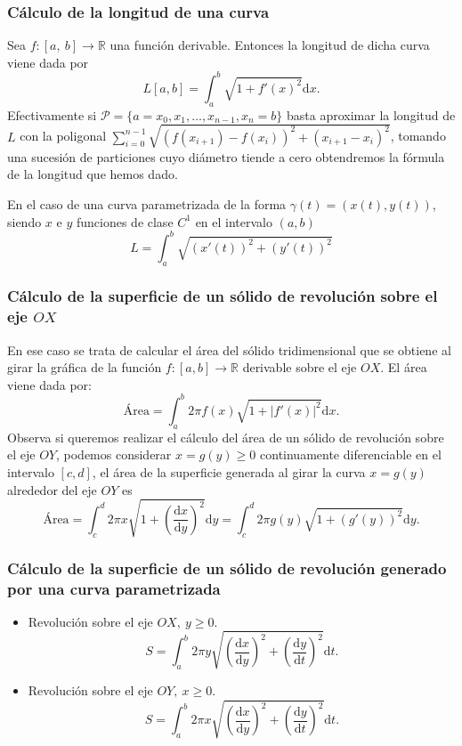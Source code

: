\subsubsection{Cálculo de la longitud de una curva}
Sea $f:[a,~b]\rightarrow\mathbb{R}$ una función derivable. Entonces la longitud de dicha curva viene dada por \[ L[a,b]=\int_a^b\sqrt{1+f'(x)^2}\mathrm{d}x. \] Efectivamente si $\mathcal{P}=\{a=x_0,x_1,\hdots,x_{n-1},x_n=b\}$ basta aproximar la longitud de $L$ con la poligonal $\sum_{i=0}^{n-1}\sqrt{\left(f(x_{i+1})-f(x_i)\right)^2+(x_{i+1}-x_i)^2}$, tomando una sucesión de particiones cuyo diámetro tiende a cero obtendremos la fórmula de la longitud que hemos dado.

En el caso de una curva parametrizada de la forma $\gamma(t)=\left(x(t),y(t)\right)$, siendo $x$ e $y$ funciones de clase $C^1$ en el intervalo $(a,b)$ \[ L=\int_a^b\sqrt{\left(x'(t)\right)^2+\left(y'(t)\right)^2} \]
\subsubsection{Cálculo de la superficie de un sólido de revolución sobre el eje $OX$}
En ese caso se trata de calcular el área del sólido tridimensional que se obtiene al girar la gráfica de la función $f:[a,b]\rightarrow\mathbb{R}$ derivable sobre el eje $OX$. El área viene dada por: \[ \text{Área}=\int_a^b2\pi f(x)\sqrt{1+|f'(x)|^2}\mathrm{d}x. \] Observa si queremos realizar el cálculo del área de un sólido de revolución sobre el eje $OY$, podemos considerar $x=g(y)\ge0$ continuamente diferenciable en el intervalo $[c,d]$, el área de la superficie generada al girar la curva $x=g(y)$ alrededor del eje $OY$ es \[ \text{Área} =\int_c^d2\pi x\sqrt{1+\left(\dfrac{\mathrm{d}x}{\mathrm{d}y}\right)^2}\mathrm{d}y=\int_c^d2\pi g(y)\sqrt{1+\left(g'(y)\right)^2}\mathrm{d}y. \]
\subsubsection{Cálculo de la superficie de un sólido de revolución generado por una curva parametrizada}
\begin{itemize}
	\item Revolución sobre el eje $OX,~y\ge0.$ \[ S=\int_a^b2\pi y\sqrt{\left(\dfrac{\mathrm{d}x}{\mathrm{d}y}\right)^2+\left(\dfrac{\mathrm{d}y}{\mathrm{d}t}\right)^2}\mathrm{d}t. \]
	\item Revolución sobre el eje $OY,~x\ge0.$ \[ S=\int_a^b2\pi x\sqrt{\left(\dfrac{\mathrm{d}x}{\mathrm{d}y}\right)^2+\left(\dfrac{\mathrm{d}y}{\mathrm{d}t}\right)^2} \mathrm{d}t.\]
\end{itemize}
